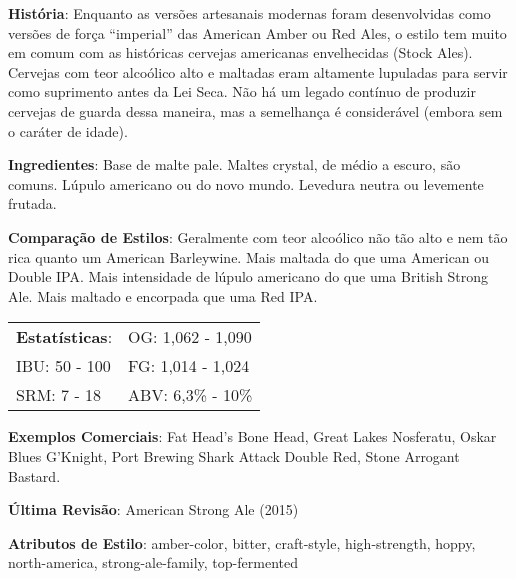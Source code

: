 \textbf{História}: Enquanto as versões artesanais modernas foram desenvolvidas como versões de força “imperial” das American Amber ou Red Ales, o estilo tem muito em comum com as históricas cervejas americanas envelhecidas (Stock Ales). Cervejas com teor alcoólico alto e maltadas eram altamente lupuladas para servir como suprimento antes da Lei Seca. Não há um legado contínuo de produzir cervejas de guarda dessa maneira, mas a semelhança é considerável (embora sem o caráter de idade).

\textbf{Ingredientes}: Base de malte pale. Maltes crystal, de médio a escuro, são comuns. Lúpulo americano ou do novo mundo. Levedura neutra ou levemente frutada.

\textbf{Comparação de Estilos}: Geralmente com teor alcoólico não tão alto e nem tão rica quanto um American Barleywine. Mais maltada do que uma American ou Double IPA. Mais intensidade de lúpulo americano do que uma British Strong Ale. Mais maltado e encorpada que uma Red IPA.

\begin{tabular}{@{}p{35mm}p{35mm}@{}}
  \textbf{Estatísticas}: & OG: 1,062 - 1,090  \\
  IBU: 50 - 100  & FG: 1,014 - 1,024   \\
  SRM: 7 - 18 & ABV: 6,3\% - 10\%
\end{tabular}

\textbf{Exemplos Comerciais}: Fat Head's Bone Head, Great Lakes Nosferatu, Oskar Blues G'Knight, Port Brewing Shark Attack Double Red, Stone Arrogant Bastard.

\textbf{Última Revisão}: American Strong Ale (2015)

\textbf{Atributos de Estilo}: amber-color, bitter, craft-style, high-strength, hoppy, north-america, strong-ale-family, top-fermented
